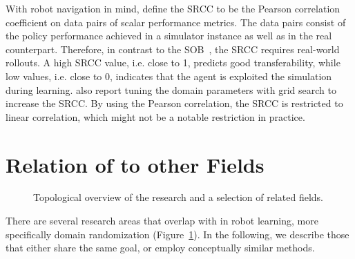 \documentclass[utf8]{frontiersSCNS} %
\begin{document}
With robot navigation in mind, \citet{Kadian_Truong_Batra_20} define the \ac{SRCC} to be the Pearson correlation coefficient on data pairs of scalar performance metrics.
The data pairs consist of the policy performance achieved in a simulator instance as well as in the real counterpart.
Therefore, in contrast to the \ac{SOB}~\citep{Muratore_Peters_18_CoRL}, the \ac{SRCC} requires real-world rollouts.
A high \ac{SRCC} value, i.e. close to 1, predicts good transferability, while low values, i.e. close to 0, indicates that the agent is exploited the simulation during learning.
\citet{Kadian_Truong_Batra_20} also report tuning the domain parameters with grid search to increase the \ac{SRCC}.
By using the Pearson correlation, the \ac{SRCC} is restricted to linear correlation, which might not be a notable restriction in practice.

\section{Relation of \SimtoReal to other Fields}
\label{sec_sota_related_fields}
\begin{figure}[t]
	\centering
	
	\caption[Overview of the \simtoreal research and related fields.]{
		Topological overview of the \simtoreal research and a selection of related fields.
	}
	\label{fig_sota_realated fields}
\end{figure}
There are several research areas that overlap with \simtoreal in robot learning, more specifically domain randomization (Figure~\ref{fig_sota_realated fields}).
In the following, we describe those that either share the same goal, or employ conceptually similar methods.

\end{document}
